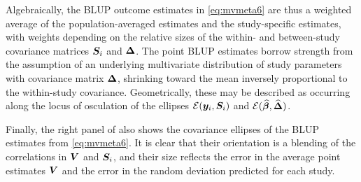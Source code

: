 Algebraically, the BLUP outcome estimates in \eqref{eq:mvmeta6}
are thus a weighted average of the population-averaged estimates and the study-specific estimates,
with weights depending on the relative sizes of the within- and between-study covariance matrices $\bm{S}_i$ and $\bm{\Delta}$.
The point BLUP estimates borrow strength from  the assumption of an underlying multivariate distribution of study parameters with covariance matrix $\bm{\Delta}$, shrinking toward the mean inversely proportional to the within-study covariance.
Geometrically, these may be described as occurring along the locus of osculation of the ellipses
$\mathcal{E}(\bm{y}_i, \bm{S}_i)$ and $\mathcal{E}(\widehat{\bm{\beta}}, \widehat{\bm{\Delta}})$.

Finally, the right panel of  also shows the covariance ellipses of the BLUP estimates
from \eqref{eq:mvmeta6}. It is clear that their orientation is a blending of the correlations in 
$\bm{V}$ and $\bm{S}_i$, and their size reflects the error in the average point estimates $\bm{V}$
and the error in the random deviation predicted for each study.